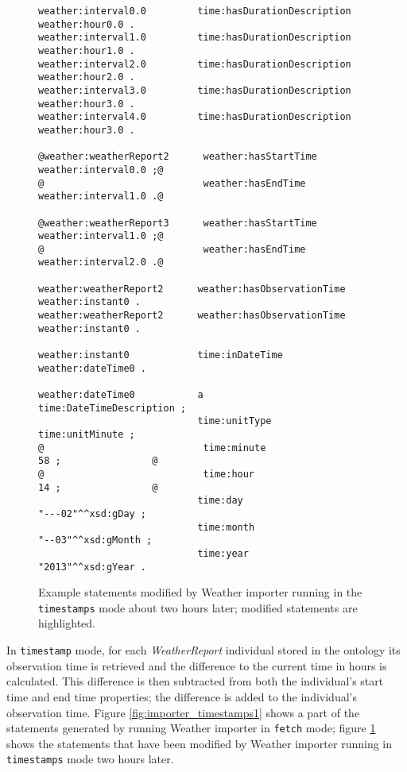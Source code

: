 \begin{figure}
\begin{lstlisting}[escapechar=!]
weather:interval0.0         time:hasDurationDescription           weather:hour0.0 .
weather:interval1.0         time:hasDurationDescription           weather:hour1.0 .
weather:interval2.0         time:hasDurationDescription           weather:hour2.0 .
weather:interval3.0         time:hasDurationDescription           weather:hour3.0 .
weather:interval4.0         time:hasDurationDescription           weather:hour3.0 .

@weather:weatherReport2      weather:hasStartTime                  weather:interval0.0 ;@
@                            weather:hasEndTime                    weather:interval1.0 .@

@weather:weatherReport3      weather:hasStartTime                  weather:interval1.0 ;@
@                            weather:hasEndTime                    weather:interval2.0 .@

weather:weatherReport2      weather:hasObservationTime            weather:instant0 .
weather:weatherReport2      weather:hasObservationTime            weather:instant0 .

weather:instant0            time:inDateTime                       weather:dateTime0 .

weather:dateTime0           a                                     time:DateTimeDescription ;
                            time:unitType                         time:unitMinute ;
@                            time:minute                           58 ;                @
@                            time:hour                             14 ;                @
                            time:day                              "---02"^^xsd:gDay ;
                            time:month                            "--03"^^xsd:gMonth ;
                            time:year                             "2013"^^xsd:gYear .
\end{lstlisting}
\caption{Example statements modified by Weather importer running in the \texttt{timestamps} mode about two hours later; modified statements are highlighted.}
\label{fig:importer_timestamps2}
\end{figure}

In \texttt{timestamp} mode, for each \emph{WeatherReport} individual stored in the ontology its observation time is retrieved and the difference to the current time in hours is calculated. This difference is then subtracted from both the individual's start time and end time properties; the difference is added to the individual's observation time. Figure \ref{fig:importer_timestamps1} shows a part of the statements generated by running Weather importer in \texttt{fetch} mode; figure \ref{fig:importer_timestamps2} shows the statements that have been modified by Weather importer running in \texttt{timestamps} mode two hours later.

